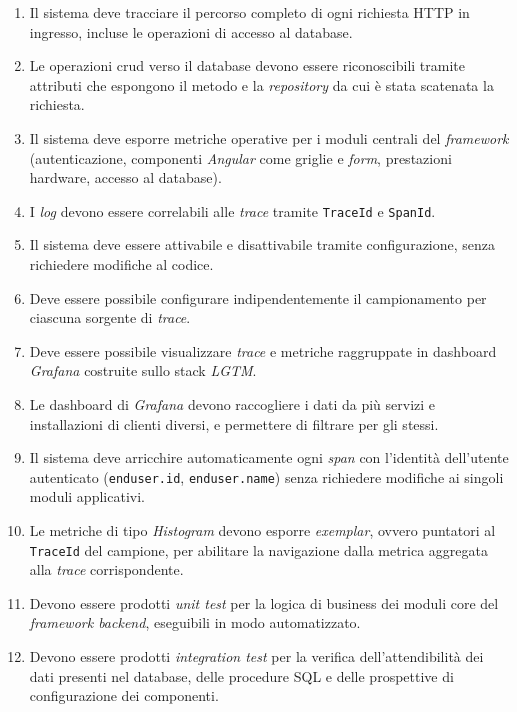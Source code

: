 \begin{enumerate}[label=RF\arabic*.]
  \item Il sistema deve tracciare il percorso completo di ogni richiesta HTTP in
        ingresso, incluse le operazioni di accesso al database.
  \item Le operazioni \gls{crud} verso il database devono essere riconoscibili tramite
        attributi che espongono il metodo e la \emph{repository} da cui è stata
        scatenata la richiesta.
  \item Il sistema deve esporre metriche operative per i moduli centrali del
        \emph{framework} (autenticazione, componenti \emph{Angular} come griglie e
        \emph{form}, prestazioni hardware, accesso al database).
  \item I \emph{log} devono essere correlabili alle \emph{trace} tramite
        \texttt{TraceId} e \texttt{SpanId}.
  \item Il sistema deve essere attivabile e disattivabile tramite configurazione,
        senza richiedere modifiche al codice.
  \item Deve essere possibile configurare indipendentemente il campionamento per
        ciascuna sorgente di \emph{trace}.
  \item Deve essere possibile visualizzare \emph{trace} e metriche raggruppate in
        dashboard \emph{Grafana} costruite sullo stack \emph{LGTM}.
  \item Le dashboard di \emph{Grafana} devono raccogliere i dati da più servizi e
        installazioni di clienti diversi, e permettere di filtrare per gli stessi.
  \item Il sistema deve arricchire automaticamente ogni \emph{span} con l'identità
        dell'utente autenticato (\texttt{enduser.id}, \texttt{enduser.name}) senza
        richiedere modifiche ai singoli moduli applicativi.
  \item Le metriche di tipo \emph{Histogram} devono esporre \emph{exemplar}, ovvero
        puntatori al \texttt{TraceId} del campione, per abilitare la navigazione dalla
        metrica aggregata alla \emph{trace} corrispondente.
  \item Devono essere prodotti \emph{unit test} per la logica di business dei moduli
        core del \emph{framework backend}, eseguibili in modo automatizzato.
  \item Devono essere prodotti \emph{integration test} per la verifica
        dell'attendibilità dei dati presenti nel database, delle procedure SQL e delle
        prospettive di configurazione dei componenti.

\end{enumerate}
